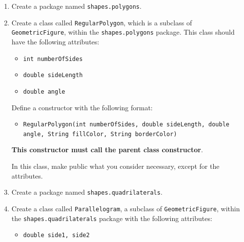 \begin{enumerate}
\begin{itemize}
        \end{itemize}

    \textbf{Ensure that neither constructors nor attributes are public}. Decide the best visibility for each one.

    \item Create a package named \texttt{shapes.polygons}.

    \item Create a class called \texttt{RegularPolygon}, which is a subclass of \texttt{GeometricFigure}, within the \texttt{shapes.polygons} package. This class should have the following attributes:

        \begin{itemize}

            \item \texttt{int numberOfSides}

            \item \texttt{double sideLength}

            \item \texttt{double angle}

        \end{itemize}

    Define a constructor with the following format:

        \begin{itemize}

            \item \texttt{RegularPolygon(int numberOfSides, double sideLength, double angle, String fillColor, String borderColor)}

        \end{itemize}

    \textbf{This constructor must call the parent class constructor}.

    In this class, make public what you consider necessary, except for the attributes.

    \item Create a package named \texttt{shapes.quadrilaterals}.

    \item Create a class called \texttt{Parallelogram}, a subclass of \texttt{GeometricFigure}, within the \texttt{shapes.quadrilaterals} package with the following attributes:

        \begin{itemize}

            \item \texttt{double side1, side2}


\end{itemize}
\end{enumerate}
